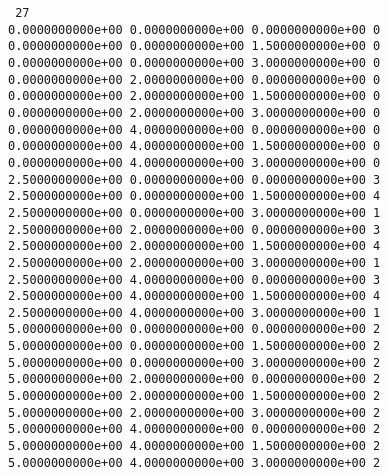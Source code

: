 \documentclass[12pt]{book}
\begin{document}
\noindent
{\tt
27\\
0.0000000000e+00 0.0000000000e+00 0.0000000000e+00 0\\
0.0000000000e+00 0.0000000000e+00 1.5000000000e+00 0\\
0.0000000000e+00 0.0000000000e+00 3.0000000000e+00 0\\
0.0000000000e+00 2.0000000000e+00 0.0000000000e+00 0\\
0.0000000000e+00 2.0000000000e+00 1.5000000000e+00 0\\
0.0000000000e+00 2.0000000000e+00 3.0000000000e+00 0\\
0.0000000000e+00 4.0000000000e+00 0.0000000000e+00 0\\
0.0000000000e+00 4.0000000000e+00 1.5000000000e+00 0\\
0.0000000000e+00 4.0000000000e+00 3.0000000000e+00 0\\
2.5000000000e+00 0.0000000000e+00 0.0000000000e+00 3\\
2.5000000000e+00 0.0000000000e+00 1.5000000000e+00 4\\
2.5000000000e+00 0.0000000000e+00 3.0000000000e+00 1\\
2.5000000000e+00 2.0000000000e+00 0.0000000000e+00 3\\
2.5000000000e+00 2.0000000000e+00 1.5000000000e+00 4\\
2.5000000000e+00 2.0000000000e+00 3.0000000000e+00 1\\
2.5000000000e+00 4.0000000000e+00 0.0000000000e+00 3\\
2.5000000000e+00 4.0000000000e+00 1.5000000000e+00 4\\
2.5000000000e+00 4.0000000000e+00 3.0000000000e+00 1\\
5.0000000000e+00 0.0000000000e+00 0.0000000000e+00 2\\
5.0000000000e+00 0.0000000000e+00 1.5000000000e+00 2\\
5.0000000000e+00 0.0000000000e+00 3.0000000000e+00 2\\
5.0000000000e+00 2.0000000000e+00 0.0000000000e+00 2\\
5.0000000000e+00 2.0000000000e+00 1.5000000000e+00 2\\
5.0000000000e+00 2.0000000000e+00 3.0000000000e+00 2\\
5.0000000000e+00 4.0000000000e+00 0.0000000000e+00 2\\
5.0000000000e+00 4.0000000000e+00 1.5000000000e+00 2\\
5.0000000000e+00 4.0000000000e+00 3.0000000000e+00 2\\
}
\end{document}
